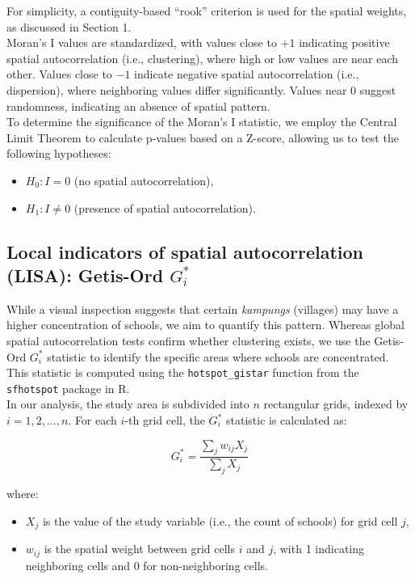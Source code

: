 \documentclass[12pt]{article}
\begin{document}
For simplicity, a contiguity-based “rook” criterion is used for the spatial weights, as discussed in Section 1. %
\\

Moran’s I values are standardized, with values close to \(+1\) indicating positive spatial autocorrelation (i.e., clustering), where high or low values are near each other. Values close to \(-1\) indicate negative spatial autocorrelation (i.e., dispersion), where neighboring values differ significantly. Values near \(0\) suggest randomness, indicating an absence of spatial pattern. \\

To determine the significance of the Moran’s I statistic, we employ the Central Limit Theorem to calculate p-values based on a Z-score, allowing us to test the following hypotheses:
\begin{itemize}
    \item \( H_0: I = 0 \) (no spatial autocorrelation),
    \item \( H_1: I \neq 0 \) (presence of spatial autocorrelation).
\end{itemize}




\subsection{Local indicators of spatial autocorrelation (LISA): Getis-Ord \( G_i^* \)}
While a visual inspection suggests that certain \textit{kampungs} (villages) may have a higher concentration of schools, we aim to quantify this pattern. Whereas global spatial autocorrelation tests confirm whether clustering exists, we use the Getis-Ord \( G_i^* \) statistic to identify the specific areas where schools are concentrated. This statistic is computed using the \texttt{hotspot\_gistar} function from the \texttt{sfhotspot} package in R. \\

In our analysis, the study area is subdivided into \( n \) rectangular grids, indexed by \( i = 1, 2, \dots, n \). For each \( i \)-th grid cell, the \( G_i^* \) statistic is calculated as:

\begin{equation}
G_i^* = \frac{\sum_j w_{ij} X_j}{\sum_j X_j}
\end{equation}

where:
\begin{itemize}
    \item \( X_j \) is the value of the study variable (i.e., the count of schools) for grid cell \( j \),
    \item \( w_{ij} \) is the spatial weight between grid cells \( i \) and \( j \), with 1 indicating neighboring cells and 0 for non-neighboring cells.
\end{itemize}
\end{document}
